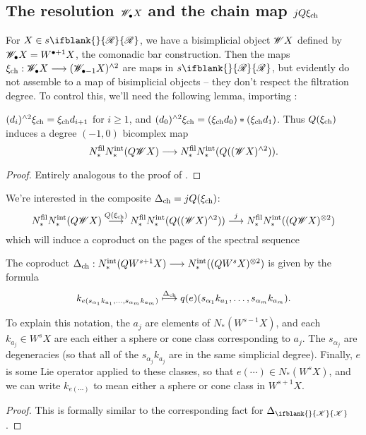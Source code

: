 \documentclass[10pt]{article}
\newcommand{\PRLie}[1]%
{\ifblank{#1}{\scrR}{\scrR^{#1}}}
\newcommand{\LL}[1]{\ifblank{#1}{\scrK}{\scrK^{#1}}}
\renewcommand{\Q}{Q}
\begin{document}
\begin{Grothendieck Multiplicativity}
\subsection{The resolution $\scrW_\bullet X$ and the chain map $j\circ Q\xi_\textup{ch}$}
For $X\in s\PRLie{}$, we have a bisimplicial object $\scrW X$ defined by $\scrW_\bullet X=W^{\bullet+1} X$, the comonadic bar construction. Then the maps $\xi_\textup{ch}:\scrW_\bullet X\to (\scrW_{\bullet-1} X)^{\wedge 2}$ are maps in $s\PRLie{}$, but evidently do not assemble to a map of bisimplicial objects -- they don't respect the filtration degree. To control this, we'll need the following lemma, importing \cite[lemma 5.5]{MR1089001}:
\begin{lem}
$(d_i)^{\wedge 2}\xi_\textup{ch}=\xi_\textup{ch}d_{i+1}$ for $i\geq1$, and $(d_0)^{\wedge 2}\xi_\textup{ch}=(\xi_\textup{ch}d_{0})*(\xi_\textup{ch}d_{1})$. Thus $\Q(\xi_\textup{ch})$ induces a degree $(-1,0)$ bicomplex map 
\[N_*^\textup{fil}N_*^\textup{int}(\Q\scrW X)\to N_*^\textup{fil}N_*^\textup{int}(\Q((\scrW X)^{\wedge 2})).\]
\end{lem}
\begin{proof}
Entirely analogous to the proof of \cite[lemma 5.5]{MR1089001}.
\end{proof}
We're interested in the composite $\Delta_\textup{ch}=j\circ Q(\xi_\textup{ch})$:
\[N_*^\textup{fil}N_*^\textup{int}(\Q\scrW X)\overset{\Q(\xi_\textup{ch})}{\to} N_*^\textup{fil}N_*^\textup{int}(\Q((\scrW X)^{\wedge 2}))\overset{j}{\to} N_*^\textup{fil}N_*^\textup{int}((\Q\scrW X)^{\otimes 2})\]
which will induce a coproduct on the pages of the spectral sequence
\begin{prop}
The coproduct $\Delta_\textup{ch}:N_*^\textup{int}(QW^{s+1}X)\to N_*^\textup{int}((QW^{s}X)^{\otimes2})$ is given by the formula
\[k_{e(s_{\alpha_1}k_{a_1},\ldots,s_{\alpha_m}k_{a_m})}\overset{\Delta_\textup{ch}}{\mapsto}q(e)(s_{\alpha_1}k_{a_1},\ldots,s_{\alpha_m}k_{a_m}).\]
\end{prop}
To explain this notation, the $a_j$ are elements of $N_*(W^{s-1}X)$, and each $k_{a_j}\in W^sX$ are each either a sphere or cone class corresponding to $a_j$. The $s_{\alpha_j}$ are degeneracies (so that all of the $s_{\alpha_j}k_{a_j}$ are in the same simplicial degree). Finally, $e$ is some Lie operator applied to these classes, so that $e(\cdots )\in N_*(W^sX)$, and we can write $k_{e(\cdots )}$ to mean either a sphere or cone class in $W^{s+1}X$.
\begin{proof}
This is formally similar to the corresponding fact for $\Delta_{\LL{}}$.
\end{proof}

\end{Grothendieck Multiplicativity}
\end{document}
